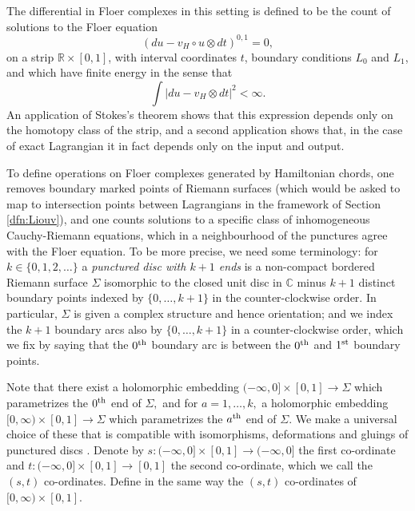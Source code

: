 \documentclass{article}
\theoremstyle{plain}%
\theoremstyle{definition}
\numberwithin{equation}{section}
\numberwithin{figure}{section}
\def\C{{\mathbin{\mathbb C}}}\def\N{{\mathbb N}}
\def\Si{\Sigma}
\def\iy{\infty}
\begin{document}
The differential in Floer complexes in this setting is defined to be the count of solutions to the Floer equation
\begin{equation} 
  (du - v_H\circ u \otimes dt)^{0,1} = 0 ,
\end{equation}
on a strip $\mathbb{R} \times [0,1]$, with interval coordinates $t$, boundary conditions $L_0$ and $L_1$, and which have finite energy in the sense that
\begin{equation}
  \int |du - v_H \otimes dt|^2 < \infty.  
\end{equation}
An application of Stokes's theorem shows that this expression depends only on the homotopy class of the strip, and a second application shows that, in the case of exact Lagrangian it in fact depends only on the input and output. %

To define operations on Floer complexes generated by Hamiltonian chords, one removes boundary marked points of Riemann surfaces (which would be asked to map to intersection points between Lagrangians in the framework of Section \ref{dfn:Liouv}), and one counts solutions to a specific class of inhomogeneous Cauchy-Riemann equations, which in a neighbourhood of the punctures agree with the Floer equation. To be more precise, we need some terminology:   for $k\in\{0,1,2,\dots\}$ a {\it punctured disc with $k+1$ ends} is a non-compact bordered Riemann surface $\Si$ isomorphic to the closed unit disc in $\C$ minus $k+1$ distinct boundary points indexed by $\{0,\dots,k+1\}$ in the counter-clockwise order. In particular, $\Si$ is given a complex structure and hence orientation; and we index the $k+1$ boundary arcs also by $\{0,\dots,k+1\}$ in a counter-clockwise order, which we fix by saying that the $0^{\rm th}$ boundary arc is between the $0^{\rm th}$ and $1^{\rm st}$ boundary points. 

Note that there exist a holomorphic embedding $(-\iy,0]\times[0,1]\to \Si$ which parametrizes the $0^{\rm th}$ end of $\Si,$ and for $a=1,\dots,k,$ a holomorphic embedding $[0,\iy)\times[0,1]\to \Si$ which parametrizes the $a^{\rm th}$ end of $\Si.$ We make a universal choice of these that is compatible with isomorphisms, deformations and gluings of punctured discs \cite[\S2.2]{AS}. Denote by $s:(-\iy,0]\times[0,1]\to(-\iy,0]$ the first co-ordinate and $t:(-\iy,0]\times[0,1]\to [0,1]$ the second co-ordinate, which we call the $(s,t)$ co-ordinates. Define in the same way the $(s,t)$ co-ordinates of $[0,\iy)\times[0,1].$ 
\end{document}
